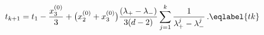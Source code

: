 \begin{equation}
t_{k+1}=t_1-\frac{x^{(0)}_3}{3}+\bigl(x^{(0)}_2+x^{(0)}_3\bigr)
\frac{(\lambda_+-\lambda_-)}{3(d-2)}
\sum_{j=1}^k\frac{1}{\lambda_+^j-\lambda_-^j}\,. \eqlabel{tk}
\end{equation}

